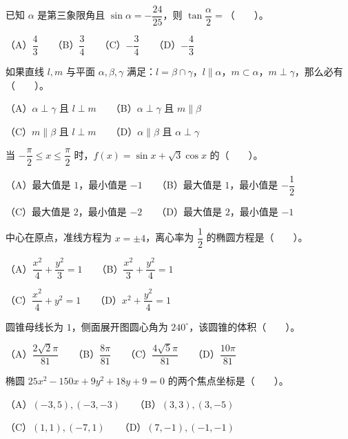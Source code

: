 \begin{question}
已知 $\alpha$ 是第三象限角且 $\sin\alpha=-\dfrac{24}{25}$，则 $\tan\dfrac{\alpha}{2}=$\mbox{（　　）}。

（A）$\dfrac{4}{3}$　　（B）$\dfrac{3}{4}$　　（C）$-\dfrac{3}{4}$　　（D）$-\dfrac{4}{3}$

\end{question}
\begin{question}
如果直线 $l,m$ 与平面 $\alpha,\beta,\gamma$ 满足：$l=\beta\cap\gamma$，$l\parallel\alpha$，$m\subset\alpha$，$m\perp\gamma$，那么必有\mbox{（　　）}。

（A）$\alpha\perp\gamma$ 且 $l\perp m$　　（B）$\alpha\perp\gamma$ 且 $m\parallel\beta$

（C）$m\parallel\beta$ 且 $l\perp m$　　（D）$\alpha\parallel\beta$ 且 $\alpha\perp\gamma$

\end{question}
\begin{question}
当 $-\dfrac{\pi}{2}\le x\le\dfrac{\pi}{2}$ 时，$f(x)=\sin x+\sqrt{3}\cos x$ 的\mbox{（　　）}。

（A）最大值是 $1$，最小值是 $-1$　　（B）最大值是 $1$，最小值是 $-\dfrac12$

（C）最大值是 $2$，最小值是 $-2$　　（D）最大值是 $2$，最小值是 $-1$

\end{question}
\begin{question}
中心在原点，准线方程为 $x=\pm4$，离心率为 $\dfrac12$ 的椭圆方程是\mbox{（　　）}。

（A）$\dfrac{x^2}{4}+\dfrac{y^2}{3}=1$　　（B）$\dfrac{x^2}{3}+\dfrac{y^2}{4}=1$

（C）$\dfrac{x^2}{4}+y^2=1$　　（D）$x^2+\dfrac{y^2}{4}=1$

\end{question}
\begin{question}
圆锥母线长为 $1$，侧面展开图圆心角为 $240^\circ$，该圆锥的体积\mbox{（　　）}。

（A）$\dfrac{2\sqrt{2}\pi}{81}$　　（B）$\dfrac{8\pi}{81}$　　（C）$\dfrac{4\sqrt{5}\pi}{81}$　　（D）$\dfrac{10\pi}{81}$

\end{question}
\begin{question}
椭圆 $25x^2-150x+9y^2+18y+9=0$ 的两个焦点坐标是\mbox{（　　）}。

（A）$(-3,5),(-3,-3)$　　（B）$(3,3),(3,-5)$

（C）$(1,1),(-7,1)$　　（D）$(7,-1),(-1,-1)$

\end{question}
